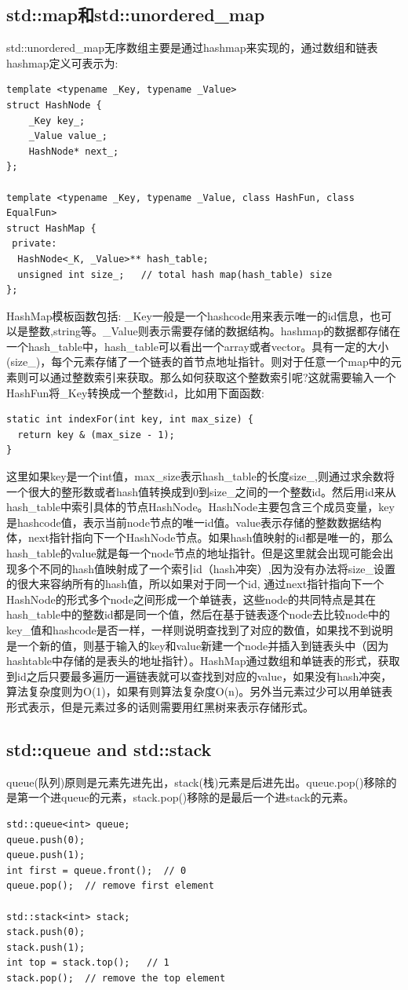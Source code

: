 \documentclass[12pt]{book}
\begin{document}
\subsection{std::map和std::unordered\_map}
std::unordered\_map无序数组主要是通过hashmap来实现的，通过数组和链表hashmap定义可表示为:
\begin{lstlisting}
template <typename _Key, typename _Value>
struct HashNode {
	_Key key_;
	_Value value_;
	HashNode* next_;
};

template <typename _Key, typename _Value, class HashFun, class EqualFun>
struct HashMap {
 private:
  HashNode<_K, _Value>** hash_table;
  unsigned int size_;   // total hash map(hash_table) size
};
\end{lstlisting}
HashMap模板函数包括: \_Key一般是一个hashcode用来表示唯一的id信息，也可以是整数,string等。\_Value则表示需要存储的数据结构。hashmap的数据都存储在一个hash\_table中，hash\_table可以看出一个array或者vector。具有一定的大小(size\_)，每个元素存储了一个链表的首节点地址指针。则对于任意一个map中的元素则可以通过整数索引来获取。那么如何获取这个整数索引呢?这就需要输入一个HashFun将\_Key转换成一个整数id，比如用下面函数:
\begin{lstlisting}
static int indexFor(int key, int max_size) {  
  return key & (max_size - 1);
}
\end{lstlisting}
这里如果key是一个int值，max\_size表示hash\_table的长度size\_,则通过求余数将一个很大的整形数或者hash值转换成到0到size\_之间的一个整数id。然后用id来从hash\_table中索引具体的节点HashNode。HashNode主要包含三个成员变量，key是hashcode值，表示当前node节点的唯一id值。value表示存储的整数数据结构体，next指针指向下一个HashNode节点。如果hash值映射的id都是唯一的，那么hash\_table的value就是每一个node节点的地址指针。但是这里就会出现可能会出现多个不同的hash值映射成了一个索引id（hash冲突）,因为没有办法将size\_设置的很大来容纳所有的hash值，所以如果对于同一个id, 通过next指针指向下一个HashNode的形式多个node之间形成一个单链表，这些node的共同特点是其在hash\_table中的整数id都是同一个值，然后在基于链表逐个node去比较node中的key\_值和hashcode是否一样，一样则说明查找到了对应的数值，如果找不到说明是一个新的值，则基于输入的key和value新建一个node并插入到链表头中（因为hashtable中存储的是表头的地址指针）。HashMap通过数组和单链表的形式，获取到id之后只要最多遍历一遍链表就可以查找到对应的value，如果没有hash冲突，算法复杂度则为O(1)，如果有则算法复杂度O(n)。另外当元素过少可以用单链表形式表示，但是元素过多的话则需要用红黑树来表示存储形式。

\subsection{std::queue and std::stack}
queue(队列)原则是元素先进先出，stack(栈)元素是后进先出。queue.pop()移除的是第一个进queue的元素，stack.pop()移除的是最后一个进stack的元素。
\begin{lstlisting}
std::queue<int> queue;
queue.push(0);
queue.push(1);
int first = queue.front();  // 0
queue.pop();  // remove first element

std::stack<int> stack;
stack.push(0);
stack.push(1);
int top = stack.top();   // 1
stack.pop();  // remove the top element
\end{lstlisting}
\end{document}

